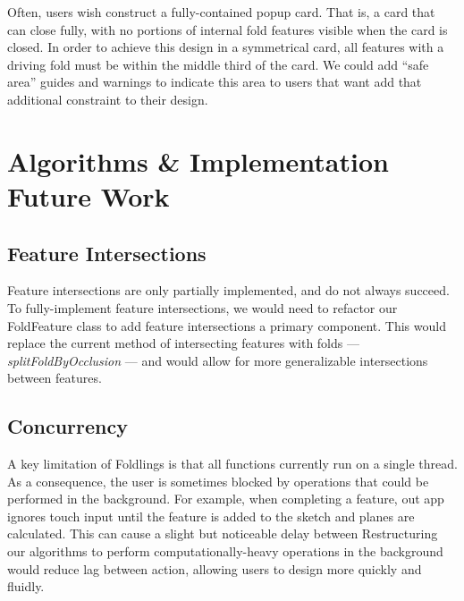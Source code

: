 Often, users wish construct a fully-contained popup card. That is, a
card that can close fully, with no portions of internal fold features
visible when the card is closed. In order to achieve this design in a
symmetrical card, all features with a driving fold must be within the
middle third of the card. We could add ``safe area'' guides and warnings
to indicate this area to users that want add that additional constraint
to their design.

\section{Algorithms \& Implementation Future
Work}\label{algorithms-implementation-future-work}

\subsection{Feature Intersections}\label{feature-intersections}

Feature intersections are only partially implemented, and do not always
succeed. To fully-implement feature intersections, we would need to
refactor our FoldFeature class to add feature intersections a primary
component. This would replace the current method of intersecting
features with folds --- \emph{splitFoldByOcclusion} --- and would allow
for more generalizable intersections between features.

\subsection{Concurrency}\label{concurrency}

A key limitation of Foldlings is that all functions currently run on a
single thread. As a consequence, the user is sometimes blocked by
operations that could be performed in the background. For example, when
completing a feature, out app ignores touch input until the feature is
added to the sketch and planes are calculated. This can cause a slight
but noticeable delay between Restructuring our algorithms to perform
computationally-heavy operations in the background would reduce lag
between action, allowing users to design more quickly and fluidly.
